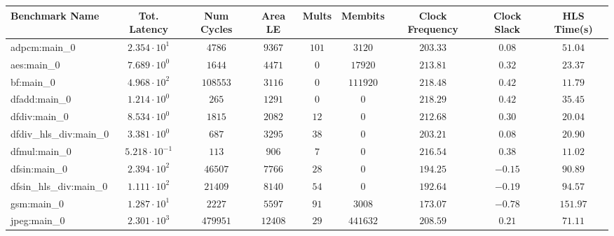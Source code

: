 \begin{tabular}{|l|c|c|c|c|c|c|c|c|}
\hline
Benchmark Name          & Tot. Latency            & Num Cycles & Area LE   & Mults   & Membits    & Clock Frequency & Clock Slack & HLS Time(s) \\
\hline
adpcm:main\_0           & $ 2.354 \cdot 10^{1}  $ & $ 4786   $ & $ 9367  $ & $ 101 $ & $ 3120   $ & $ 203.33      $ & $ 0.08    $ & $ 51.04   $ \\
aes:main\_0             & $ 7.689 \cdot 10^{0}  $ & $ 1644   $ & $ 4471  $ & $ 0   $ & $ 17920  $ & $ 213.81      $ & $ 0.32    $ & $ 23.37   $ \\
bf:main\_0              & $ 4.968 \cdot 10^{2}  $ & $ 108553 $ & $ 3116  $ & $ 0   $ & $ 111920 $ & $ 218.48      $ & $ 0.42    $ & $ 11.79   $ \\
dfadd:main\_0           & $ 1.214 \cdot 10^{0}  $ & $ 265    $ & $ 1291  $ & $ 0   $ & $ 0      $ & $ 218.29      $ & $ 0.42    $ & $ 35.45   $ \\
dfdiv:main\_0           & $ 8.534 \cdot 10^{0}  $ & $ 1815   $ & $ 2082  $ & $ 12  $ & $ 0      $ & $ 212.68      $ & $ 0.30    $ & $ 20.04   $ \\
dfdiv\_hls\_div:main\_0 & $ 3.381 \cdot 10^{0}  $ & $ 687    $ & $ 3295  $ & $ 38  $ & $ 0      $ & $ 203.21      $ & $ 0.08    $ & $ 20.90   $ \\
dfmul:main\_0           & $ 5.218 \cdot 10^{-1} $ & $ 113    $ & $ 906   $ & $ 7   $ & $ 0      $ & $ 216.54      $ & $ 0.38    $ & $ 11.02   $ \\
dfsin:main\_0           & $ 2.394 \cdot 10^{2}  $ & $ 46507  $ & $ 7766  $ & $ 28  $ & $ 0      $ & $ 194.25      $ & $ -0.15   $ & $ 90.89   $ \\
dfsin\_hls\_div:main\_0 & $ 1.111 \cdot 10^{2}  $ & $ 21409  $ & $ 8140  $ & $ 54  $ & $ 0      $ & $ 192.64      $ & $ -0.19   $ & $ 94.57   $ \\
gsm:main\_0             & $ 1.287 \cdot 10^{1}  $ & $ 2227   $ & $ 5597  $ & $ 91  $ & $ 3008   $ & $ 173.07      $ & $ -0.78   $ & $ 151.97  $ \\
jpeg:main\_0            & $ 2.301 \cdot 10^{3}  $ & $ 479951 $ & $ 12408 $ & $ 29  $ & $ 441632 $ & $ 208.59      $ & $ 0.21    $ & $ 71.11   $ \\

\end{tabular}
